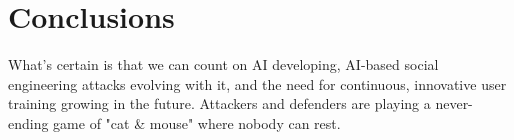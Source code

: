 
\chapter{Conclusions\label{conclusions}}

What's certain is that we can count on AI developing, AI-based social engineering attacks evolving with it, and the need for continuous, innovative user training growing in the future. Attackers and defenders are playing a never-ending game of "cat \& mouse" where nobody can rest.

